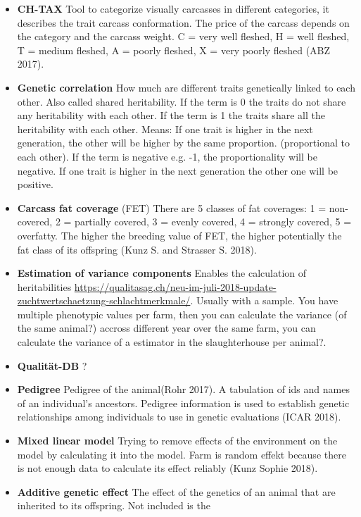 \documentclass[]{article}
\begin{document}
\begin{itemize}
  (ABZ 2017)
\item
  \textbf{CH-TAX} Tool to categorize visually carcasses in different
  categories, it describes the trait carcass conformation. The price of
  the carcass depends on the category and the carcass weight. C = very
  well fleshed, H = well fleshed, T = medium fleshed, A = poorly
  fleshed, X = very poorly fleshed (ABZ 2017).
\item
  \textbf{Genetic correlation} How much are different traits genetically
  linked to each other. Also called shared heritability. If the term is
  0 the traits do not share any heritability with each other. If the
  term is 1 the traits share all the heritability with each other.
  Means: If one trait is higher in the next generation, the other will
  be higher by the same proportion. (proportional to each other). If the
  term is negative e.g. -1, the proportionality will be negative. If one
  trait is higher in the next generation the other one will be positive.
\item
  \textbf{Carcass fat coverage} (FET) There are 5 classes of fat
  coverages: 1 = non-covered, 2 = partially covered, 3 = evenly covered,
  4 = strongly covered, 5 = overfatty. The higher the breeding value of
  FET, the higher potentially the fat class of its offspring (Kunz S.
  and Strasser S. 2018).
\item
  \textbf{Estimation of variance components} Enables the calculation of
  heritabilities
  \url{https://qualitasag.ch/neu-im-juli-2018-update-zuchtwertschaetzung-schlachtmerkmale/}.
  Usually with a sample. You have multiple phenotypic values per farm,
  then you can calculate the variance (of the same animal?) accross
  different year over the same farm, you can calculate the variance of a
  estimator in the slaughterhouse per animal?.
\item
  \textbf{Qualität-DB} ?
\item
  \textbf{Pedigree} Pedigree of the animal(Rohr 2017). A tabulation of
  ids and names of an individual's ancestors. Pedigree information is
  used to establish genetic relationships among individuals to use in
  genetic evaluations (ICAR 2018).
\item
  \textbf{Mixed linear model} Trying to remove effects of the
  environment on the model by calculating it into the model. Farm is
  random effekt because there is not enough data to calculate its effect
  reliably (Kunz Sophie 2018).
\item
  \textbf{Additive genetic effect} The effect of the genetics of an
  animal that are inherited to its offspring. Not included is the

\end{itemize}
\end{document}
